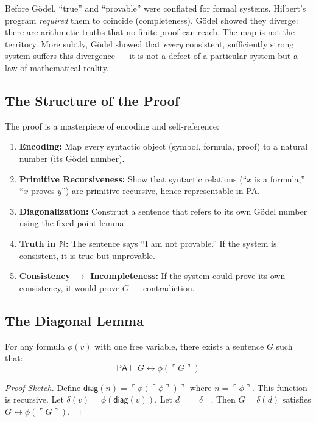 Before Gödel, ``true'' and ``provable'' were conflated for formal systems. Hilbert's program \emph{required} them to coincide (completeness). Gödel showed they diverge: there are arithmetic truths that no finite proof can reach. The map is not the territory. More subtly, Gödel showed that \emph{every} consistent, sufficiently strong system suffers this divergence --- it is not a defect of a particular system but a law of mathematical reality.

\subsection{The Structure of the Proof}
\label{sec:godel:structure}

The proof is a masterpiece of encoding and self-reference:

\begin{enumerate}
\item \textbf{Encoding:} Map every syntactic object (symbol, formula, proof) to a natural number (its Gödel number).
\item \textbf{Primitive Recursiveness:} Show that syntactic relations (``$x$ is a formula,'' ``$x$ proves $y$'') are primitive recursive, hence representable in PA.
\item \textbf{Diagonalization:} Construct a sentence that refers to its own Gödel number using the fixed-point lemma.
\item \textbf{Truth in $\mathbb{N}$:} The sentence says ``I am not provable.'' If the system is consistent, it is true but unprovable.
\item \textbf{Consistency $\to$ Incompleteness:} If the system could prove its own consistency, it would prove $G$ --- contradiction.
\end{enumerate}

\subsection{The Diagonal Lemma}
\label{sec:godel:diagonal}

\begin{lemma}
For any formula $\phi(v)$ with one free variable, there exists a sentence $G$ such that:
\[
\mathsf{PA} \vdash G \leftrightarrow \phi(\ulcorner G \urcorner)
\]
\end{lemma}

\begin{proof}[Proof Sketch]
Define $\mathsf{diag}(n) = \ulcorner \phi(\ulcorner \phi \urcorner) \urcorner$ where $n = \ulcorner \phi \urcorner$. This function is recursive. Let $\delta(v) = \phi(\mathsf{diag}(v))$. Let $d = \ulcorner \delta \urcorner$. Then $G = \delta(d)$ satisfies $G \leftrightarrow \phi(\ulcorner G \urcorner)$.
\end{proof}

